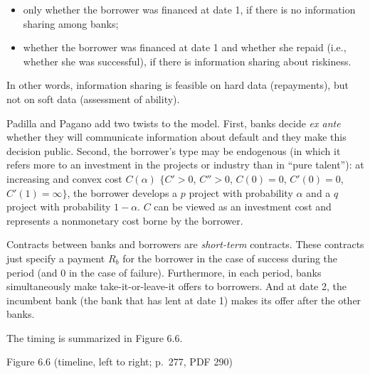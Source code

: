 \documentclass[11pt,a4paper]{article}
\providecommand{\tightlist}{\setlength{\itemsep}{0pt}\setlength{\parskip}{0pt}}
\begin{document}
\begin{itemize}
\tightlist
\item
  only whether the borrower was financed at date 1, if there is no information sharing among banks;
\item
  whether the borrower was financed at date 1 and whether she repaid (i.e., whether she was
  successful), if there is information sharing about riskiness.
\end{itemize}

In other words, information sharing is feasible on hard data (repayments), but not on soft data
(assessment of ability).

Padilla and Pagano add two twists to the model. First, banks decide \emph{ex ante} whether they will
communicate information about default and they make this decision public. Second, the borrower's
type may be endogenous (in which it refers more to an investment in the projects or industry than in
``pure talent''): at increasing and convex cost \(C(\alpha)\) \(\{C' > 0\), \(C'' > 0\),
\(C(0) = 0\), \(C'(0) = 0\), \(C'(1) = \infty\}\), the borrower develops a \(p\) project with
probability \(\alpha\) and a \(q\) project with probability \(1 - \alpha\). \(C\) can be viewed as
an investment cost and represents a nonmonetary cost borne by the borrower.

Contracts between banks and borrowers are \emph{short-term} contracts. These contracts just specify
a payment \(R_b\) for the borrower in the case of success during the period (and 0 in the case of
failure). Furthermore, in each period, banks simultaneously make take-it-or-leave-it offers to
borrowers. And at date 2, the incumbent bank (the bank that has lent at date 1) makes its offer
after the other banks.

The timing is summarized in Figure 6.6.

Figure 6.6 (timeline, left to right; p.~277, PDF 290)
\end{document}
